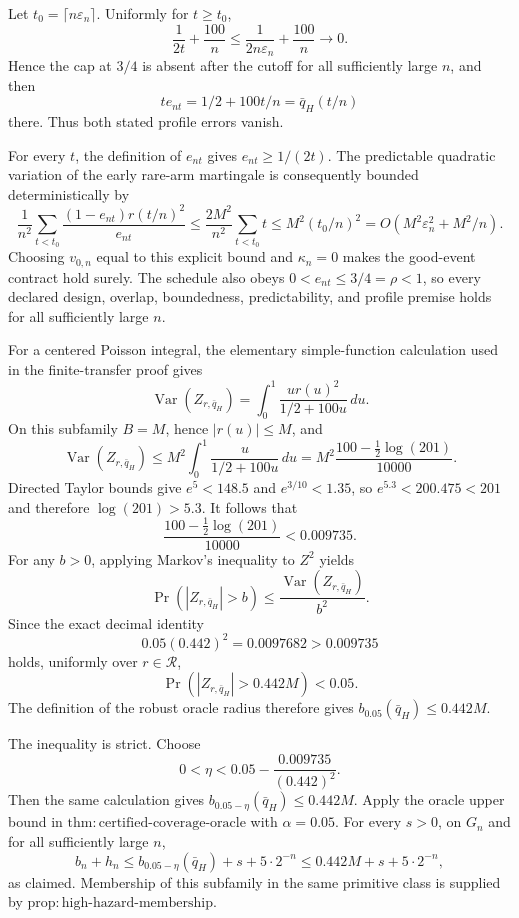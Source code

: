 Let \(t_0=\lceil n\varepsilon_n\rceil\).  Uniformly for \(t\geq t_0\),
\[
 \frac{1}{2t}+\frac{100}{n}
 \leq\frac{1}{2n\varepsilon_n}+\frac{100}{n}\longrightarrow0.
\]
Hence the cap at \(3/4\) is absent after the cutoff for all sufficiently large \(n\), and then
\[
 t e_{nt}=1/2+100t/n=\bar q_H(t/n)
\]
there.  Thus both stated profile errors vanish.

For every \(t\), the definition of \(e_{nt}\) gives
\(e_{nt}\geq1/(2t)\).  The predictable quadratic variation of the early rare-arm martingale is consequently bounded deterministically by
\[
 \frac1{n^2}\sum_{t<t_0}
 \frac{(1-e_{nt})r(t/n)^2}{e_{nt}}
 \leq\frac{2M^2}{n^2}\sum_{t<t_0}t
 \leq M^2(t_0/n)^2
 =O(M^2\varepsilon_n^2+M^2/n).
\]
Choosing \(v_{0,n}\) equal to this explicit bound and \(\kappa_n=0\) makes the good-event contract hold surely.  The schedule also obeys
\(0<e_{nt}\leq3/4=\rho<1\), so every declared design, overlap, boundedness, predictability, and profile premise holds for all sufficiently large \(n\).

For a centered Poisson integral, the elementary simple-function calculation used in the finite-transfer proof gives
\[
 \operatorname{Var}(Z_{r,\bar q_H})
 =\int_0^1\frac{u r(u)^2}{1/2+100u}\,du.
\]
On this subfamily \(B=M\), hence \(|r(u)|\leq M\), and
\[
 \operatorname{Var}(Z_{r,\bar q_H})
 \leq M^2\int_0^1\frac{u}{1/2+100u}\,du
 =M^2\frac{100-\frac12\log(201)}{10000}.
\]
Directed Taylor bounds give \(e^5<148.5\) and \(e^{3/10}<1.35\), so
\(e^{5.3}<200.475<201\) and therefore \(\log(201)>5.3\).  It follows that
\[
 \frac{100-\frac12\log(201)}{10000}
 <0.009735.
\]
For any \(b>0\), applying Markov's inequality to \(Z^2\) yields
\[
 \Pr(|Z_{r,\bar q_H}|>b)
 \leq\frac{\operatorname{Var}(Z_{r,\bar q_H})}{b^2}.
\]
Since the exact decimal identity
\[
 0.05(0.442)^2=0.0097682>0.009735
\]
holds, uniformly over \(r\in\mathcal R\),
\[
 \Pr(|Z_{r,\bar q_H}|>0.442M)<0.05.
\]
The definition of the robust oracle radius therefore gives
\(b_{0.05}(\bar q_H)\leq0.442M\).

The inequality is strict.  Choose
\[
 0<\eta<
 0.05-\frac{0.009735}{(0.442)^2}.
\]
Then the same calculation gives
\(b_{0.05-\eta}(\bar q_H)\leq0.442M\).
Apply the oracle upper bound in
\(\mathrm{thm:certified\mbox{-}coverage\mbox{-}oracle}\) with
\(\alpha=0.05\).  For every \(s>0\), on \(G_n\) and for all sufficiently large \(n\),
\[
 b_n+h_n
 \leq b_{0.05-\eta}(\bar q_H)+s+5\cdot2^{-n}
 \leq0.442M+s+5\cdot2^{-n},
\]
as claimed.  Membership of this subfamily in the same primitive class is supplied by
\(\mathrm{prop:high\mbox{-}hazard\mbox{-}membership}\).

